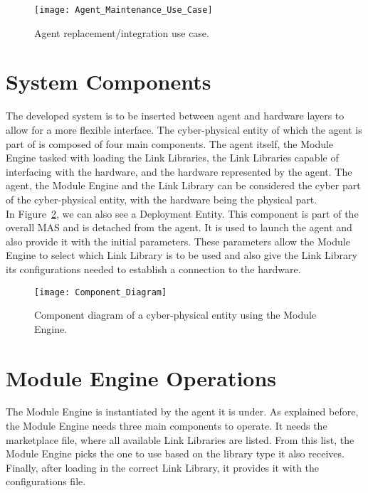 \begin{figure}[h!]
	\centering
		\texttt{[image: Agent\_Maintenance\_Use\_Case]}
	\caption{Agent replacement/integration use case.}
	\label{fig:agent_maintenance_use_case}
\end{figure}

\section{System Components}
\label{sec:system_components}

The developed system is to be inserted between agent and hardware layers to allow for a more flexible interface. The cyber-physical entity of which the agent is part of is composed of four main components. The agent itself, the Module Engine tasked with loading the Link Libraries, the Link Libraries capable of interfacing with the hardware, and the hardware represented by the agent. The agent, the Module Engine and the Link Library can be considered the cyber part of the cyber-physical entity, with the hardware being the physical part.\\

In Figure~\ref{fig:component_diagram}, we can also see a Deployment Entity. This component is part of the overall \acrshort{MAS} and is detached from the agent. It is used to launch the agent and also provide it with the initial parameters. These parameters allow the Module Engine to select which Link Library is to be used and also give the Link Library its configurations needed to establish a connection to the hardware.\\

\begin{figure}[h!]
	\centering
	\texttt{[image: Component\_Diagram]}
	\caption{Component diagram of a cyber-physical entity using the Module Engine.}
	\label{fig:component_diagram}
\end{figure}

\section{Module Engine Operations}
\label{sec:module_engine_operations}

The Module Engine is instantiated by the agent it is under. As explained before, the Module Engine needs three main components to operate. It needs the marketplace file, where all available Link Libraries are listed. From this list, the Module Engine picks the one to use based on the library type it also receives. Finally, after loading in the correct Link Library, it provides it with the configurations file.\\

